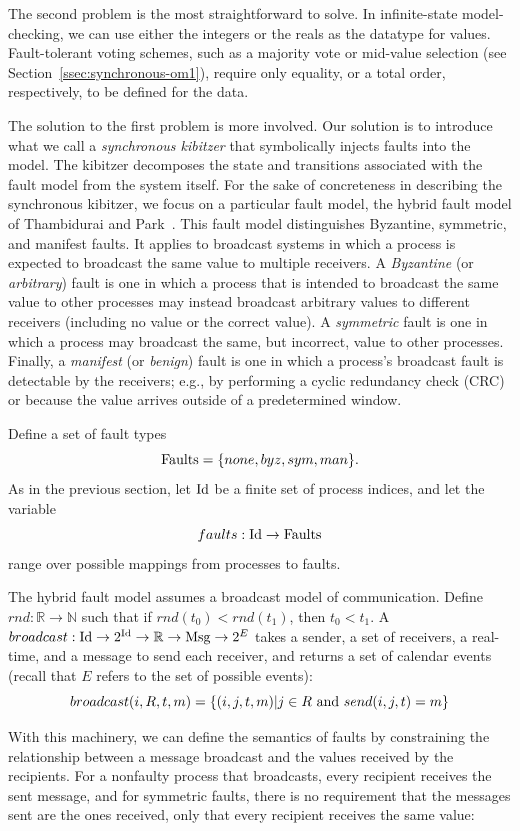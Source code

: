 The second problem is the most straightforward to solve. In
infinite-state model-checking, we can use either the integers or
the reals as the datatype for values. Fault-tolerant voting schemes,
such as a majority vote or mid-value selection (see Section~\ref{ssec:synchronous-om1}),
require only equality, or a total order, respectively, to be defined
for the data.

The solution to the first problem is more involved. Our solution
is to introduce what we call a \emph{synchronous kibitzer} that
symbolically injects faults into the model. The kibitzer decomposes
the state and transitions associated with the fault model from the
system itself. For the sake of concreteness in describing the
synchronous kibitzer, we focus on a particular fault model, the
hybrid fault model of Thambidurai and Park~\cite{Tha88:RDSS}. This fault
model distinguishes Byzantine, symmetric, and manifest faults. It
applies to broadcast systems in which a process is expected to
broadcast the same value to multiple receivers. A \emph{Byzantine}
(or \emph{arbitrary}) fault is one in which a process that is
intended to broadcast the same value to other processes may instead
broadcast arbitrary values to different receivers (including no
value or the correct value). A \emph{symmetric} fault is one in
which a process may broadcast the same, but incorrect, value to
other processes. Finally, a \emph{manifest} (or \emph{benign}) fault
is one in which a process's broadcast fault is detectable by the
receivers; e.g., by performing a cyclic redundancy check (CRC) or
because the value arrives outside of a predetermined window.

Define a set of fault types $$\textnormal{Faults} = \{none, byz,
sym, man\}.$$ As in the previous section, let $\mathrm{Id}$ be a finite set
of process indices, and let the variable $$faults: \mathrm{Id} \rightarrow
\textnormal{Faults}$$ range over possible mappings from processes
to faults.

The hybrid fault model assumes a broadcast model of communication.
Define $rnd: \mathbb{R} \rightarrow \mathbb{N}$ such that if
$rnd(t_0) < rnd(t_1)$, then $t_0 < t_1$.  A $broadcast: \mathrm{Id} \rightarrow
2^{\mathrm{Id}} \rightarrow \mathbb{R} \rightarrow \mathrm{Msg} \rightarrow 2^{E}$
takes a sender, a set of receivers, a real-time, and a message to
send each receiver, and returns a set of calendar events (recall that $E$
refers to the set of possible events): $$broadcast(i,
R, t, m) = \{ (i,j,t,m) | j \in R \textnormal{ and } send(i, j, t) = m\}$$

With this machinery, we can define the semantics of faults by
constraining the relationship between a message broadcast and the
values received by the recipients. For a nonfaulty process that
broadcasts, every recipient receives the sent message, and for
symmetric faults, there is no requirement that the messages sent
are the ones received, only that every recipient receives the same
value:

